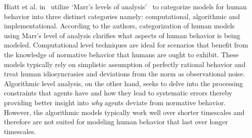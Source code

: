 \documentclass[12pt]{article}
\begin{document}
Hiatt et al. in~\cite{hiatt2017human} utilize `Marr's levels of analysis'~\cite{marr1982vision} to categorize models for human behavior into three distinct categories namely: computational, algorithmic and implementational.
According to the authors, categorization of human models using Marr's level of analysis clarifies what aspects of human behavior is being modeled. Computational level techniques are ideal for scenarios that benefit from the knowledge of normative behavior that humans are ought to exhibit. These models typically rely on simplistic assumption of perfectly rational behavior and treat human idiosyncrasies and deviations from the norm as observational noise. Algorithmic level analysis, on the other hand, seeks to delve into the processing constraints that agents have and how they lead to systematic errors thereby providing better insight into \textit{why} agents deviate from normative behavior. However, the algorithmic models typically work well over shorter timescales and therefore are not suited for modeling human behavior that last over longer timescales. 
\end{document}
